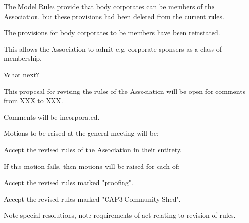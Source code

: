 \documentclass[../constitution.tex]{subfiles}
\begin{document}
The Model Rules provide that body corporates can be members of the Association, but these provisions had been deleted from the current rules.

The provisions for body corporates to be members have been reinstated.

This allows the Association to admit e.g. corporate sponsors as a class of membership.







What next?

This proposal for revising the rules of the Association will be open for comments from XXX to XXX.

Comments will be incorporated.

Motions to be raised at the general meeting will be:

Accept the revised rules of the Association in their entirety.

If this motion fails, then motions will be raised for each of:

Accept the revised rules marked "proofing".

Accept the revised rules marked "CAP3-Community-Shed".

Note special resolutions, note requirements of act relating to revision of rules.
\end{document}
